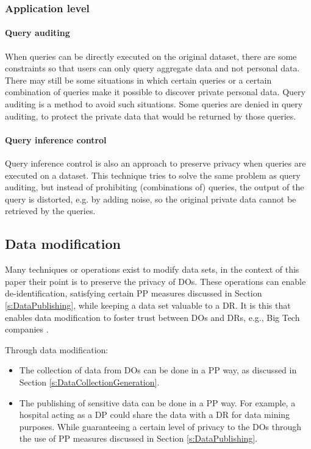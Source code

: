     \newpage
    \subsubsection{Application level}
    
        \paragraph{Query auditing}
        
        When queries can be directly executed on the original dataset, there are some constraints so that users can only query aggregate data and not personal data.
        There may still be some situations in which certain queries or a certain combination of queries make it possible to discover private personal data. 
        Query auditing \cite{Mendes2017} is a method to avoid such situations. 
        Some queries are denied in query auditing, to protect the private data that would be returned by those queries.

        \paragraph{Query inference control}
        
        
        Query inference control \cite{Mendes2017} is also an approach to preserve privacy when queries are executed on a dataset.
        This technique tries to solve the same problem as query auditing, but instead of prohibiting (combinations of) queries,
		  the output of the query is distorted, e.g. by adding noise, so the original private data cannot be retrieved by the queries. 
      
\subsection{Data modification}
\label{s:DataModification}

Many techniques or operations exist to modify data sets, in the context of this paper their point is to preserve the privacy of \gls{DO}s.
These operations can enable de-identification, satisfying certain \gls{PP} measures discussed in Section \ref{s:DataPublishing}, while keeping a data set valuable to a \gls{DR}.
It is this that enables data modification to foster trust between \gls{DO}s and \gls{DR}s, e.g., Big Tech companies \cite{Barbosa2020}.

Through data modification:
\begin{itemize}
    \item
        The collection of data from \gls{DO}s can be done in a \gls{PP} way, as discussed in Section \ref{s:DataCollectionGeneration}.
    \item
        The publishing of sensitive data can be done in a \gls{PP} way.
        For example, a hospital acting as a \gls{DP} could share the data with a \gls{DR} for data mining purposes.
        While guaranteeing a certain level of privacy to the \gls{DO}s through the use of \gls{PP} measures discussed in Section \ref{s:DataPublishing}.
\end{itemize}

